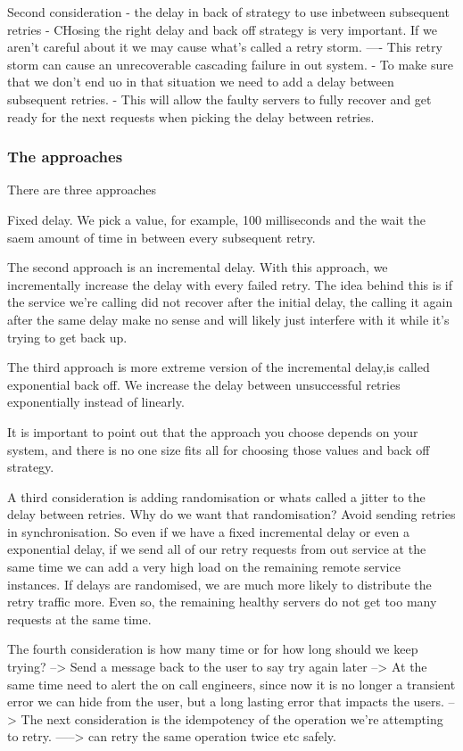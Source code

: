 \documentclass[a4paper, 11pt]{book}
\begin{document}
    Second consideration
    - the delay in back of strategy to use inbetween subsequent retries
    - CHosing the right delay and back off strategy is very important.
    If we aren't careful about it we may cause what's called a retry storm.
    ---- This retry storm can cause an unrecoverable cascading failure in out system.
    - To make sure that we don't end uo in that situation we need to add a delay between subsequent retries.
    - This will allow the faulty servers to fully recover and get ready for the next requests when picking the delay between retries.

    \subsubsection{The approaches}
    There are three approaches

    Fixed delay. We pick a value, for example, 100 milliseconds and the wait the saem amount of time in between every subsequent retry.

    The second approach is an incremental delay.
    With this approach, we incrementally increase the delay with every failed retry.
    The idea behind this is if the service we're calling did not recover after the initial delay, the calling it again after the same delay make no sense and will likely just interfere with it while it's trying to get back up.

    The third approach is more extreme version of the incremental delay,is called exponential back off.
    We increase the delay between unsuccessful retries exponentially instead of linearly.

    It is important to point out that the approach you choose depends on your system, and there is no one size fits all for choosing those values and back off strategy.

    A third consideration is adding randomisation or whats called a jitter to the delay between retries.
    Why do we want that randomisation?
    Avoid sending retries in synchronisation.
    So even if we have a fixed incremental delay or even a exponential delay, if we send all of our retry requests from out service at the same time we can add a very high load on the remaining remote service instances.
    If delays are randomised, we are much more likely to distribute the retry traffic more.
    Even so, the remaining healthy servers do not get too many requests at the same time.

    The fourth consideration is how many time or for how long should we keep trying?
    --> Send a message back to the user to say try again later
    -->  At the same time need to alert the on call engineers, since now it is no longer a transient error we can hide from the user, but a long lasting error that impacts the users.
    --> The next consideration is the idempotency of the operation we're attempting to retry.
    -----> can retry the same operation twice etc safely.
\end{document}
